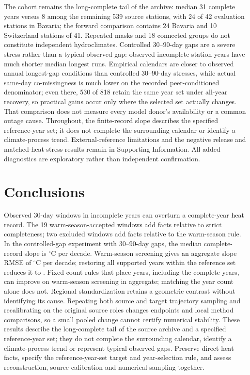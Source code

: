\documentclass[draft,linenumbers]{agujournal2025}
\begin{document}
The cohort remains the long-complete tail of the archive: median 31 complete years versus 8 among the remaining 539 source stations, with 24 of 42 evaluation stations in Bavaria; the forward comparison contains 24 Bavaria and 10 Switzerland stations of 41. Repeated masks and 18 connected groups do not constitute independent hydroclimates. Controlled 30--90-day gaps are a severe stress rather than a typical observed gap: observed incomplete station-years have much shorter median longest runs. Empirical calendars are closer to observed annual longest-gap conditions than controlled 30--90-day stresses, while actual same-day co-missingness is much lower on the recorded peer-conditioned denominator; even there, 530 of 818 retain the same year set under all-year recovery, so practical gains occur only where the selected set actually changes. That comparison does not measure every model donor's availability or a common outage cause. Throughout, the finite-record slope describes the specified reference-year set; it does not complete the surrounding calendar or identify a climate-process trend. External-reference limitations and the negative release and matched-heat-stress results remain in Supporting Information. All added diagnostics are exploratory rather than independent confirmation.

\section{Conclusions}
Observed 30-day windows in incomplete years can overturn a complete-year heat record. The 19 warm-season-accepted windows add facts relative to strict completeness; two excluded windows add facts relative to the warm-season rule. In the controlled-gap experiment with 30--90-day gaps, the median complete-record slope is \PTRTimeMedianSlope{}$^{\circ}$C per decade. Warm-season screening gives an aggregate slope RMSE of \PTRTimeWarmRMSE{}$^{\circ}$C per decade; restoring all supported years within the reference set reduces it to \PTRTimeAllRMSE{}. Fixed-count rules that place years, including the complete years, can improve on warm-season screening in aggregate; matching the year count alone does not. Regional standardization retains a geometric contrast without identifying its cause. Repeating both source and target trajectory sampling and recalibrating on the original source roles changes endpoints and local method comparisons, so a small pooled change cannot certify numerical stability. These results describe the long-complete tail of the source archive and a specified reference-year set; they do not complete the surrounding calendar, identify a climate-process trend or represent typical observed gaps. Preserve direct heat facts, specify the reference-year-set target and year-selection rule, and assess reconstruction, source calibration and numerical sampling together.
\end{document}
